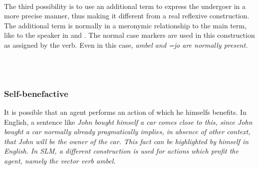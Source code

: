  \\


The third possibility is to use an additional term to express the undergoer in a more precise manner, thus making it different from a real reflexive construction. The additional term is normally in a meronymic relationship to the main term, like  to the speaker in  and . The normal case markers are used in this construction as assigned by the verb.
Even in this case, \em ambel \em and \em =jo \em are normally present.


 \\

 \\






\subsubsection{Self-benefactive}\label{sec:func:Self-benefactive}
It is possible that an agent performs an action of which he himselfs benefits. In English, a sentence like \em John bought himself a car \em comes close to this, since \em John bought a car \em normally already pragmatically implies, in absence of other context, that John will be the owner of the car. This fact can be highlighted by \em himself \em in English. In SLM, a different construction is used for actions which profit the agent, namely the vector verb \em ambel\em.


